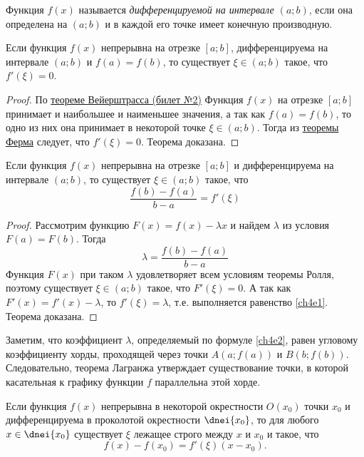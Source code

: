 \begin{defn}
Функция $f(x)$ называется \textit{дифференцируемой на интервале $(a;b)$}, если она определена на $(a;b)$ и в каждой его точке имеет конечную производную.

\end{defn}
\begin{thm} [Ролля] Если функция $f(x)$ непрерывна на отрезке $[a; b]$, дифференцируема на интервале $(a; b)$ и $f(a) = f(b)$, то существует $\xi \in (a; b)$ такое, что $f'(\xi) = 0$.
\end{thm}
\begin{proof}
По \hyperref[ch1n1]{теореме Вейерштрасса (билет №2)} Функция $f(x)$ на отрезке $[a;b]$ принимает и наибольшее и наименьшее значения, а так как $f(a) = f(b)$, то одно из них она принимает в некоторой точке $\xi \in (a; b)$. Тогда из  \hyperref[ch4n1]{теоремы Ферма} следует, что $f'(\xi) = 0$. 
\noindent Теорема доказана.
\end{proof}

\begin{thm}[Лагранжа]\label{ch4t1} Если функция $f(x)$ непрерывна на отрезке $[a; b]$ и дифференцируема на интервале $(a; b)$, то существует $\xi \in (a; b)$ такое, что
\begin{equation}\label{ch4e1}
\frac{f(b)-f(a)}{b-a}=f'(\xi)
\end{equation}
\end{thm}

\begin{proof} Рассмотрим функцию $F(x) = f(x) - \lambda x$ и найдем $\lambda$ из условия $F(a) = F(b)$. Тогда
\begin{equation}\label{ch4e2}
\lambda=\frac{f(b)-f(a)}{b-a}
\end{equation}
Функция $F(x)$ при таком $\lambda$ удовлетворяет всем условиям теоремы Ролля, поэтому существует $\xi \in (a; b)$ такое, что $F'(\xi) = 0$. А так как $F'(x) = f'(x) - \lambda$, то $f'(\xi) = \lambda$, т.е. выполняется равенство \eqref{ch4e1}. 
\noindent Теорема доказана.
\end{proof}
Заметим, что коэффициент $\lambda$, определяемый по формуле \eqref{ch4e2}, равен угловому коэффициенту хорды, проходящей через точки $A(a;f(a))$ и $B(b;f(b))$. Следовательно, теорема Лагранжа утверждает существование точки, в которой касательная к графику функции $f$ параллельна этой хорде.
\begin{cons} 
Если функция $f(x)$ непрерывна в некоторой окрестности $O(x_0)$ точки $x_0$ и дифференцируема в проколотой
окрестности $\dnei{x_0}$, то для любого $x \in \dnei{x_0}$ существует $\xi$ лежащее строго между $x$ и $x_0$ и такое, что
\begin{equation}\label{ch4e3}
f(x)-f(x_0)=f'(\xi)(x-x_0).
\end{equation}
\end{cons}

